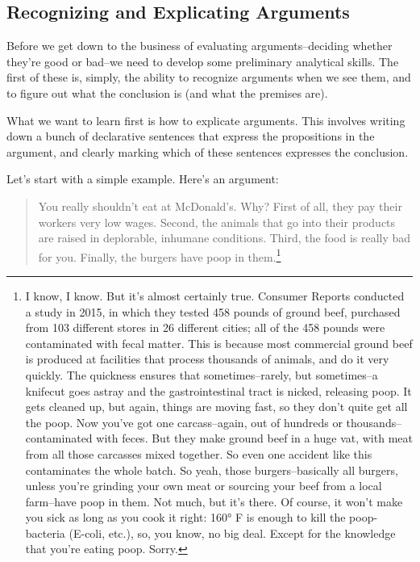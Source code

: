 \subsection{Recognizing and Explicating Arguments}
Before we get down to the business of evaluating arguments--deciding whether they're good or
bad--we need to develop some preliminary analytical skills. The first of these is, simply, the ability
to recognize arguments when we see them, and to figure out what the conclusion is (and what the
premises are).

What we want to learn first is how to explicate arguments. This involves writing down a bunch of
declarative sentences that express the propositions in the argument, and clearly marking which of
these sentences expresses the conclusion.

Let's start with a simple example. Here's an argument:

\begin{quotation}
You really shouldn't eat at McDonald's. Why? First of all, they pay their workers very low
wages. Second, the animals that go into their products are raised in deplorable, inhumane
conditions. Third, the food is really bad for you. Finally, the burgers have poop in 
them.\footnote{I know, I know. But it's almost certainly true. Consumer Reports conducted a study in 2015, in which they tested
458 pounds of ground beef, purchased from 103 different stores in 26 different cities; all of the 458 pounds were
contaminated with fecal matter. This is because most commercial ground beef is produced at facilities that process
thousands of animals, and do it very quickly. The quickness ensures that sometimes--rarely, but sometimes--a knifecut goes astray and the gastrointestinal tract is nicked, releasing poop. It gets cleaned up, but again, things are moving
fast, so they don't quite get all the poop. Now you've got one carcass--again, out of hundreds or thousands--
contaminated with feces. But they make ground beef in a huge vat, with meat from all those carcasses mixed together.
So even one accident like this contaminates the whole batch. So yeah, those burgers--basically all burgers, unless
you're grinding your own meat or sourcing your beef from a local farm--have poop in them. Not much, but it's there.
Of course, it won't make you sick as long as you cook it right: 160° F is enough to kill the poop-bacteria (E-coli, etc.),
so, you know, no big deal. Except for the knowledge that you're eating poop. Sorry.}
\end{quotation}

